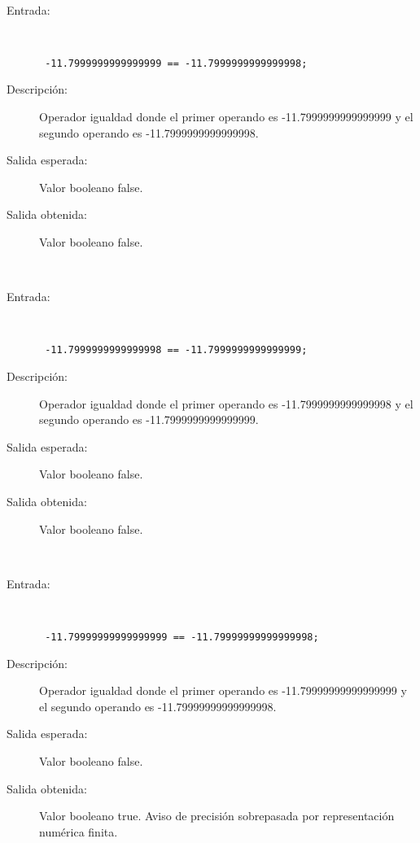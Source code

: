 \hfil \\
	\begin{description}
		\item [Entrada:] \hfill \\
\begin{lstlisting}
 -11.7999999999999999 == -11.7999999999999998;
\end{lstlisting}
		\item [Descripción:] Operador igualdad donde el primer operando es -11.7999999999999999 y el segundo operando es  -11.7999999999999998.
		\item [Salida esperada:] Valor booleano false.
		\item [Salida obtenida:] Valor booleano false.
	\end{description}
\hfil \\
	\begin{description}
		\item [Entrada:] \hfill \\
\begin{lstlisting}
 -11.7999999999999998 == -11.7999999999999999;
\end{lstlisting}
		\item [Descripción:] Operador igualdad donde el primer operando es -11.7999999999999998 y el segundo operando es  -11.7999999999999999.
		\item [Salida esperada:] Valor booleano false.
		\item [Salida obtenida:] Valor booleano false.
	\end{description}
\hfil \\
	\begin{description}
		\item [Entrada:] \hfill \\
\begin{lstlisting}
 -11.79999999999999999 == -11.79999999999999998;
\end{lstlisting}
		\item [Descripción:] Operador igualdad donde el primer operando es -11.79999999999999999 y el segundo operando es  -11.79999999999999998.
		\item [Salida esperada:] Valor booleano false.
		\item [Salida obtenida:] Valor booleano true. Aviso de precisión sobrepasada por representación numérica finita.
	\end{description}
